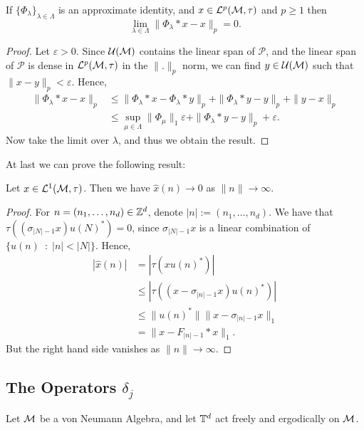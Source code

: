 \begin{proposition}
     If $\{\Phi_\lambda\}_{\lambda \in \Lambda}$
    is an approximate identity, and $x \in \mathcal{L}^p(\mathcal{M},\tau)$
    and $p \geq 1$
    then
    \begin{equation}
        \lim_{\lambda \in \Lambda}\|\Phi_\lambda*x-x\|_p = 0.
    \end{equation}    
\end{proposition}
\begin{proof}
    Let $\varepsilon > 0$.
    Since $\mathcal{U}(\mathcal{M})$ contains the linear span of $\mathcal{P}$,
    and the linear span of $\mathcal{P}$ is dense in $\mathcal{L}^p(\mathcal{M},\tau)$
    in the $\|.\|_p$ norm, we can find $y \in \mathcal{U}(\mathcal{M})$ such
    that $\|x-y\|_p < \varepsilon$. Hence,
    \begin{align}
        \|\Phi_\lambda*x-x\|_p &\leq \|\Phi_\lambda*x-\Phi_\lambda*y\|_p + \|\Phi_\lambda*y-y\|_p + \|y-x\|_p\\
        &\leq \sup_{\mu \in \Lambda} \|\Phi_\mu\|_1\varepsilon + \|\Phi_\lambda*y-y\|_p + \varepsilon.
    \end{align}
    Now take the limit over $\lambda$, and thus we obtain the result.
\end{proof}

At last we can prove the following result:
\begin{proposition}
    Let $x \in \mathcal{L}^1(\mathcal{M},\tau)$. Then we have $\hat{x}(n) \rightarrow 0$
    as $\|n\|\rightarrow\infty$.
\end{proposition}
\begin{proof}
    For $n = (n_1,\ldots,n_d) \in \mathbb{Z}^d$, denote $|n| := (n_1,\ldots,n_d)$.
    We have that $\tau((\sigma_{|N|-1}x)u(N)^*) = 0$, since $\sigma_{|N|-1}x$
    is a linear combination of $\{u(n)\:\;:\;|n| < |N|\}$. Hence,
    \begin{align}
        |\hat{x}(n)| &= |\tau(xu(n)^*)|\\
&\leq |\tau((x-\sigma_{|n|-1}x)u(n)^*)|\\
&\leq \|u(n)^*\|\|x-\sigma_{|n|-1}x\|_1\\
&= \|x-F_{|n|-1}*x\|_1.
    \end{align}
    But the right hand side vanishes as $\|n\|\rightarrow\infty$.
\end{proof}

\subsection{The Operators $\delta_j$}
Let $\mathcal{M}$ be a von Neumann Algebra, and let $\mathbb{T}^d$
act freely and ergodically on $\mathcal{M}$. 

